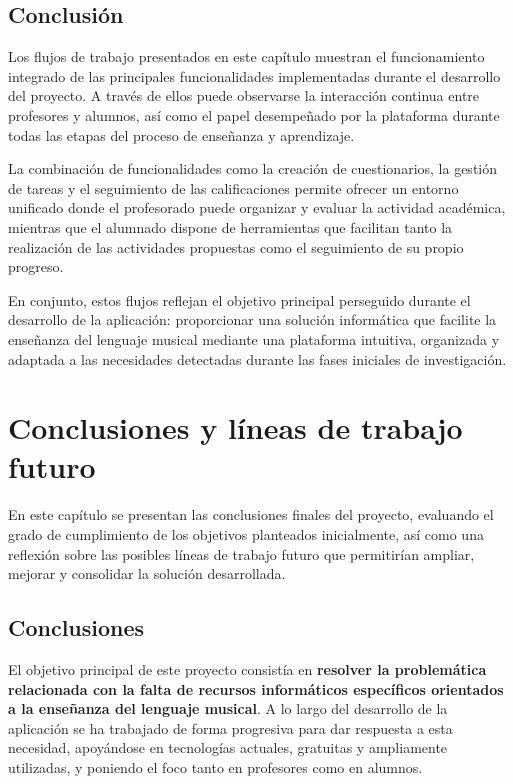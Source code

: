 \section{Conclusión}

Los flujos de trabajo presentados en este capítulo muestran el funcionamiento integrado de las principales funcionalidades implementadas durante el desarrollo del proyecto. A través de ellos puede observarse la interacción continua entre profesores y alumnos, así como el papel desempeñado por la plataforma durante todas las etapas del proceso de enseñanza y aprendizaje.

La combinación de funcionalidades como la creación de cuestionarios, la gestión de tareas y el seguimiento de las calificaciones permite ofrecer un entorno unificado donde el profesorado puede organizar y evaluar la actividad académica, mientras que el alumnado dispone de herramientas que facilitan tanto la realización de las actividades propuestas como el seguimiento de su propio progreso.

En conjunto, estos flujos reflejan el objetivo principal perseguido durante el desarrollo de la aplicación: proporcionar una solución informática que facilite la enseñanza del lenguaje musical mediante una plataforma intuitiva, organizada y adaptada a las necesidades detectadas durante las fases iniciales de investigación.


\chapter{Conclusiones y líneas de trabajo futuro}
\label{sec:conclu}
En este capítulo se presentan las conclusiones finales del proyecto, evaluando el grado de cumplimiento de los objetivos planteados inicialmente, así como una reflexión sobre las posibles líneas de trabajo futuro que permitirían ampliar, mejorar y consolidar la solución desarrollada.

\section{Conclusiones}

El objetivo principal de este proyecto consistía en \textbf{resolver la problemática relacionada con la falta de recursos informáticos específicos orientados a la enseñanza del lenguaje musical}. A lo largo del desarrollo de la aplicación se ha trabajado de forma progresiva para dar respuesta a esta necesidad, apoyándose en tecnologías actuales, gratuitas y ampliamente utilizadas, y poniendo el foco tanto en profesores como en alumnos.

